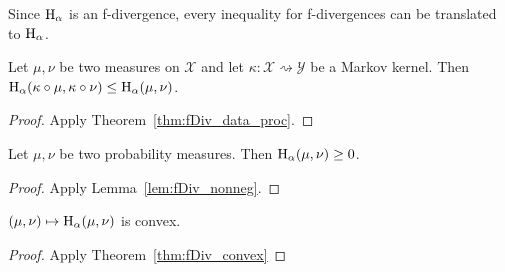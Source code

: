 Since $\operatorname{H}_\alpha$ is an f-divergence, every inequality for f-divergences can be translated to $\operatorname{H}_\alpha$.

\begin{theorem}
  \label{thm:hellingerAlpha_data_proc}
  Let $\mu, \nu$ be two measures on $\mathcal X$ and let $\kappa : \mathcal X \rightsquigarrow \mathcal Y$ be a Markov kernel.
  Then $\operatorname{H}_\alpha(\kappa \circ \mu, \kappa \circ \nu) \le \operatorname{H}_\alpha(\mu, \nu)$.
\end{theorem}

\begin{proof}
Apply Theorem~\ref{thm:fDiv_data_proc}.
\end{proof}

\begin{lemma}
  \label{lem:hellingerAlpha_nonneg}
  Let $\mu, \nu$ be two probability measures. Then $\operatorname{H}_\alpha(\mu, \nu) \ge 0$.
\end{lemma}

\begin{proof}
Apply Lemma~\ref{lem:fDiv_nonneg}.
\end{proof}

\begin{lemma}
  \label{lem:hellingerAlpha_convex}
  $(\mu, \nu) \mapsto \operatorname{H}_\alpha(\mu, \nu)$ is convex.
\end{lemma}

\begin{proof}
Apply Theorem~\ref{thm:fDiv_convex}
\end{proof}
